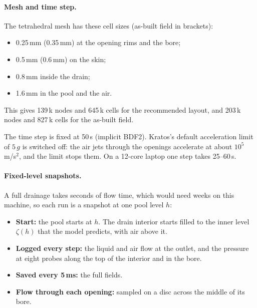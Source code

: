 \documentclass[10pt,a4paper]{article}
\begin{document}
\paragraph{Mesh and time step.} The tetrahedral mesh has these cell sizes (as-built field in brackets):
\begin{itemize}
\item 0.25\,mm (0.35\,mm) at the opening rims and the bore;
\item 0.5\,mm (0.6\,mm) on the skin;
\item 0.8\,mm inside the drain;
\item 1.6\,mm in the pool and the air.
\end{itemize}
This gives 139\,k nodes and 645\,k cells for the recommended layout, and 203\,k nodes and 827\,k cells for the as-built field.

The time step is fixed at 50\,\textmu s (implicit BDF2). Kratos's default acceleration limit of $5\,g$ is switched off: the air jets through the openings accelerate at about $10^5$\,m/s$^2$, and the limit stops them. On a 12-core laptop one step takes 25--60\,s.

\paragraph{Fixed-level snapshots.} A full drainage takes seconds of flow time, which would need weeks on this machine, so each run is a snapshot at one pool level $h$:
\begin{itemize}
\item \textbf{Start:} the pool starts at $h$. The drain interior starts filled to the inner level $\zeta(h)$ that the model predicts, with air above it.
\item \textbf{Logged every step:} the liquid and air flow at the outlet, and the pressure at eight probes along the top of the interior and in the bore.
\item \textbf{Saved every 5\,ms:} the full fields.
\item \textbf{Flow through each opening:} sampled on a disc across the middle of its bore.
\end{itemize}
\end{document}
